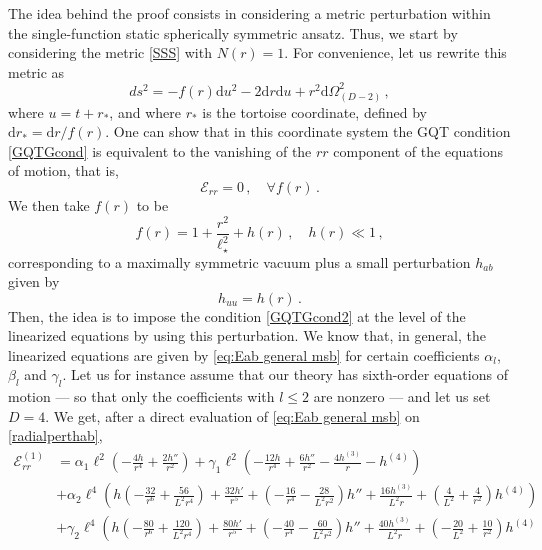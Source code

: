 \documentclass[11pt]{article}
\newcommand{\diff}{\mathrm{d}}
\begin{document}
{The idea behind the proof consists in considering a metric perturbation within the single-function static spherically symmetric ansatz. Thus, we start by considering the metric \eqref{SSS} with $N(r)=1$. For convenience, let us rewrite this metric as 
\begin{equation}
ds^2=-f(r)\diff u^2-2 \diff r \diff u+r^2\diff\Omega_{(D-2)}^2\, ,
\end{equation}
where $u=t+r_{*}$, and where $r_*$ is the tortoise coordinate, defined by $\diff r_{*}=\diff r/f(r)$. One can show that in this coordinate system the GQT condition \eqref{GQTGcond} is equivalent to the vanishing of the $rr$ component of the equations of motion, that is, 
\begin{equation}\label{GQTGcond2}
\mathcal{E}_{rr}=0\, ,\quad \forall f(r)\, .
\end{equation}
We then take $f(r)$ to be 
\begin{equation}\label{radialpert}
f(r)=1+\frac{r^2}{\ell_{\star}^2}+h(r)\, ,\quad h(r)\ll 1\, ,
\end{equation}
corresponding to a maximally symmetric vacuum plus a small perturbation $h_{ab}$ given by
\begin{equation}\label{radialperthab}
h_{uu}=h(r)\, .
\end{equation} 
Then, the idea is to impose the condition \eqref{GQTGcond2} at the level of the linearized equations by using this perturbation. We know that, in general, the linearized equations are given by \eqref{eq:Eab general msb} for certain coefficients $\alpha_l$, $\beta_l$ and $\gamma_l$. Let us for instance assume that our theory has sixth-order equations of motion --- so that only the coefficients with $l\le 2$ are nonzero --- and let us set $D=4$. We get, after a direct evaluation of \eqref{eq:Eab general msb} on \eqref{radialperthab},
\begin{equation}\label{Errlinear}
\begin{aligned}
\mathcal{E}_{rr}^{(1)}&=\alpha_1 \ell^2\left(-\frac{4 h}{r^4}+\frac{2 h''}{r^2}\right)+\gamma _1\ell^2 \left(-\frac{12 h}{r^4}+\frac{6 h''}{r^2}-\frac{4 h^{(3)}}{r}-h^{(4)}\right)\\
&+\alpha _2 \ell^4 \left(h \left(-\frac{32}{r^6}+\frac{56}{L^2 r^4}\right)+\frac{32 h'}{r^5}+\left(-\frac{16}{r^4}-\frac{28}{L^2 r^2}\right) h''+\frac{16 h^{(3)}}{L^2
   r}+\left(\frac{4}{L^2}+\frac{4}{r^2}\right) h^{(4)}\right)\\
   &+\gamma _2 \ell^4\left(h \left(-\frac{80}{r^6}+\frac{120}{L^2 r^4}\right)+\frac{80
   h'}{r^5}+\left(-\frac{40}{r^4}-\frac{60}{L^2 r^2}\right) h''+\frac{40 h^{(3)}}{L^2 r}+\left(-\frac{20}{L^2}+\frac{10}{r^2}\right) h^{(4)}\right.\\

\end{aligned}
\end{equation}}
\end{document}
